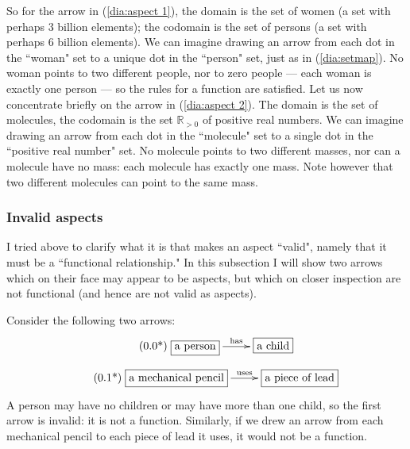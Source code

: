 \documentclass{book}
\def\tn{\textnormal}
\def\RR{{\mathbb R}}
\newcommand{\LA}[2]{\ar[#1]^-{\tn {#2}}}
\theoremstyle{remark}
\theoremstyle{definition}
\begin{document}
So for the arrow in (\ref{dia:aspect 1}), the domain is the set of women (a set with perhaps 3 billion elements); the codomain is the set of persons (a set with perhaps 6 billion elements).   We can imagine drawing an arrow from each dot in the ``woman" set to a unique dot in the ``person" set, just as in (\ref{dia:setmap}).  No woman points to two different people, nor to zero people --- each woman is exactly one person --- so the rules for a function are satisfied.  Let us now concentrate briefly on the arrow in (\ref{dia:aspect 2}).  The domain is the set of molecules, the codomain is the set $\RR_{>0}$ of positive real numbers.  We can imagine drawing an arrow from each dot in the ``molecule" set to a single dot in the ``positive real number" set.  No molecule points to two different masses, nor can a molecule have no mass: each molecule has exactly one mass.  Note however that two different molecules can point to the same mass.


\subsubsection{Invalid aspects}\label{sec:invalid aspect}

I tried above to clarify what it is that makes an aspect ``valid", namely that it must be a ``functional relationship."  In this subsection I will show two arrows which on their face may appear to be aspects, but which on closer inspection are not functional (and hence are not valid as aspects).  
 
Consider the following two arrows:
\begin{align}\tag{\arabic{subsection}.\arabic{equation}*}\addtocounter{equation}{1}\label{dia:invalid 1}
\xymatrixnocompile{\fbox{a person}\LA{r}{has}&\fbox{a child}}
\end{align}
\vspace{-.13in}
\begin{align}\tag{\arabic{subsection}.\arabic{equation}*}\addtocounter{equation}{1}\label{dia:invalid 2}
\xymatrixnocompile{\fbox{a mechanical pencil}\LA{r}{uses}&\fbox{a piece of lead}}
\end{align}  
A person may have no children or may have more than one child, so the first arrow is invalid: it is not a function.  Similarly, if we drew an arrow from each mechanical pencil to each piece of lead it uses, it would not be a function.
\end{document}
